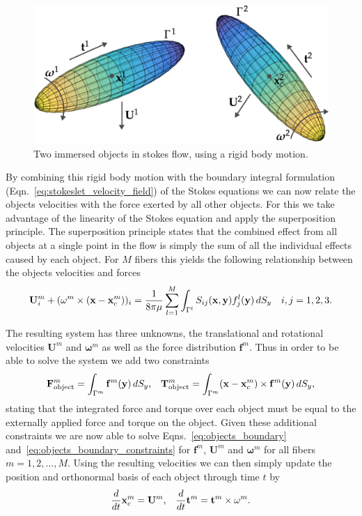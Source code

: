 \begin{figure}[!htbp]
  \centering
  \includegraphics[width=.8\textwidth]{img/immersed_rigid.png}
  \caption{Two immersed objects in stokes flow, using a rigid body motion.}
  \label{fig:immersed_rigid}
\end{figure}

By combining this rigid body motion with the boundary integral formulation (Eqn.~\eqref{eq:stokeslet_velocity_field}) of the Stokes equations we can now relate the objects velocities with the force exerted by all other objects. For this we take advantage of the linearity of the Stokes equation and apply the superposition principle. The superposition principle states that the combined effect from all objects at a single point in the flow is simply the sum of all the individual effects caused by each object. For $M$ fibers this yields the following relationship between the objects velocities and forces
\begin{equation}
  \label{eq:objects_boundary}
	\mathbf{U}_i^m + (\mathbf{\omega}^m \times (\mathbf{x} - \mathbf{x}_c^m))_i = \frac{1}{8 \pi \mu} \sum_{l=1}^{M} \int_{\Gamma^l} S_{ij}(\mathbf{x},\mathbf{y})f_j^l(\mathbf{y}) \, dS_y \quad i,j =1,2,3 \text{.}
\end{equation}

The resulting system has three unknowns, the translational and rotational velocities $\mathbf{U}^m$ and $\mathbf{\omega}^m$ as well as the force distribution $\mathbf{f}^m$. Thus in order to be able to solve the system we add two constraints
\begin{equation}
	\label{eq:objects_boundary_constraints}
	\mathbf{F}_{\text{object}}^m = \int_{\Gamma^m} \mathbf{f}^m(\mathbf{y}) \, dS_y\text{,} \quad \mathbf{T}_{\text{object}}^m = \int_{\Gamma^m} (\mathbf{x} - \mathbf{x}_c^m) \times \mathbf{f}^m(\mathbf{y}) \, dS_y \text{,}
\end{equation}
stating that the integrated force and torque over each object must be equal to the externally applied force and torque on the object. Given these additional constraints we are now able to solve Eqns.~\eqref{eq:objects_boundary} and~\eqref{eq:objects_boundary_constraints} for $\mathbf{f}^m$, $\mathbf{U}^m$ and $\mathbf{\omega}^m$ for all fibers $m=1,2,\dots,M$. Using the resulting velocities we can then simply update the position and orthonormal basis of each object through time $t$ by
\begin{equation}
	\label{eq:objects_update}
	\frac{d}{dt}\mathbf{x}_c^m = \mathbf{U}^m \text{,} \quad \frac{d}{dt}\mathbf{t}^m = \mathbf{t}^m \times \mathbf{\omega}^m \text{.}
\end{equation}

